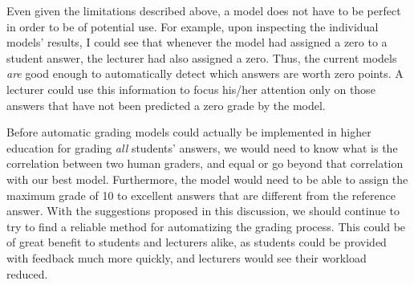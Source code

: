 \documentclass[a4paper,10pt,twoside]{article}
\begin{document}
Even given the limitations described above, a model does not have to be perfect in order to be of potential use. For example, upon inspecting the individual models' results, I could see that whenever the model had assigned a zero to a student answer, the lecturer had also assigned a zero. Thus, the current models \textit{are} good enough to automatically detect which answers are worth zero points. A lecturer could use this information to focus his/her attention only on those answers that have not been predicted a zero grade by the model.

Before automatic grading models could actually be implemented in higher education for grading \textit{all} students' answers, we would need to know what is the correlation between two human graders, and equal or go beyond that correlation with our best model. Furthermore, the model would need to be able to assign the maximum grade of 10 to excellent answers that are different from the reference answer. With the suggestions proposed in this discussion, we should continue to try to find a reliable method for automatizing the grading process. This could be of great benefit to students and lecturers alike, as students could be provided with feedback much more quickly, and lecturers would see their workload reduced.


 
 

\newpage
\end{document}
